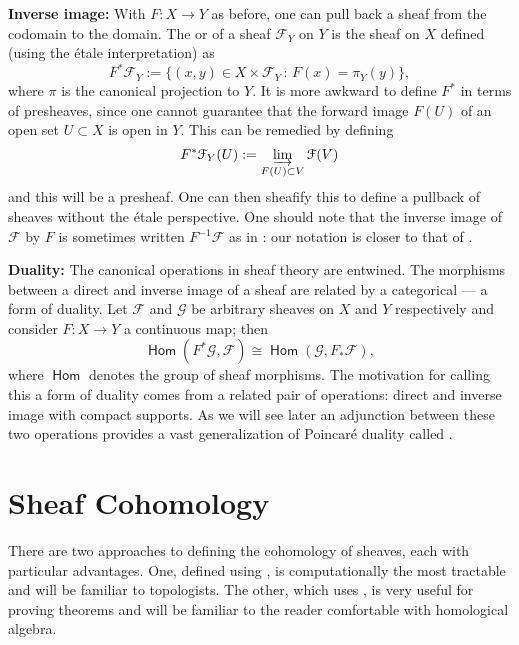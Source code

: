 \documentclass{psapm-l}
\theoremstyle{definition}
\theoremstyle{remark}
\numberwithin{equation}{section}
\begin{document}
\vspace{0.1in}
\noindent
{\bf Inverse image:} With $F\colon X\to Y$ as before, one can pull back a sheaf from the codomain to the domain. The {{}} or {{}} of a sheaf ${{\mathcal F}}_Y$ on $Y$ is the sheaf on $X$ defined (using the \'etale interpretation) as
\[
    F^*{{\mathcal F}}_Y := \{ (x,y) \in X\times{{\mathcal F}}_Y \, : \, F(x)={{\pi}}_Y(y) \} ,
\]
where ${{\pi}}$ is the canonical projection to $Y$. It is more awkward to define $F^*$ in terms of presheaves, since one cannot guarantee that the forward image $F(U)$ of an open set $U\subset X$ is open in $Y$. This can be remedied by defining
\[
   F^*{{\mathcal F}}_Y(U) := \varinjlim_{F(U)\subset V} {{\mathcal F}}(V)
\]
and this will be a presheaf. One can then sheafify this to define a pullback of sheaves without the \'etale perspective. One should note that the inverse image of ${{\mathcal F}}$ by $F$ is sometimes written $F{^{-1}}{{\mathcal F}}$ as in \cite{KS}: our notation is closer to that of  \cite{Iversen}.

\vspace{0.1in}
\noindent
{\bf Duality:} The canonical operations in sheaf theory are entwined. The morphisms between a direct and inverse image of a
sheaf are related by a categorical {{}} --- a form of duality. Let ${{\mathcal F}}$ and $\mathcal{G}$ be arbitrary sheaves on $X$ and $Y$ respectively and consider $F\colon X\to Y$ a continuous map; then
\begin{equation}
        {{{\operatorname{\mathsf{{Hom}}}}}}(F^*\mathcal{G},{{\mathcal F}})\cong{{{\operatorname{\mathsf{{Hom}}}}}}(\mathcal{G},F_*{{\mathcal F}}),
\end{equation}
where ${{{\operatorname{\mathsf{{Hom}}}}}}$ denotes the group of sheaf morphisms. The motivation for calling this a form of duality comes from a related pair of operations: direct and inverse image with compact supports. As we will see later an adjunction between these two operations provides a vast generalization of Poincar\'e duality called {{}} \cite{Schurmann,Dimca}.

\section{Sheaf Cohomology}
\label{sec:shcohom}

There are two approaches to defining the cohomology of sheaves, each with particular advantages. One, defined using {{}}, is computationally the most tractable and will be familiar to topologists. The other, which uses {{}}, is very useful for proving theorems and will be familiar to the reader comfortable with homological algebra.
\end{document}
